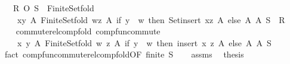 \begin{isabellebody}
\ \ \ {\isachardoublequoteopen}R\ O\ S\ {\isacharequal}{\kern0pt}\ Finite{\isacharunderscore}{\kern0pt}Set{\isachardot}{\kern0pt}fold\isanewline
\ \ \ \ {\isacharparenleft}{\kern0pt}{\isasymlambda}{\isacharparenleft}{\kern0pt}x{\isacharcomma}{\kern0pt}y{\isacharparenright}{\kern0pt}\ A{\isachardot}{\kern0pt}\ Finite{\isacharunderscore}{\kern0pt}Set{\isachardot}{\kern0pt}fold\ {\isacharparenleft}{\kern0pt}{\isasymlambda}{\isacharparenleft}{\kern0pt}w{\isacharcomma}{\kern0pt}z{\isacharparenright}{\kern0pt}\ A{\isacharprime}{\kern0pt}{\isachardot}{\kern0pt}\ if\ y\ {\isacharequal}{\kern0pt}\ w\ then\ Set{\isachardot}{\kern0pt}insert\ {\isacharparenleft}{\kern0pt}x{\isacharcomma}{\kern0pt}z{\isacharparenright}{\kern0pt}\ A{\isacharprime}{\kern0pt}\ else\ A{\isacharprime}{\kern0pt}{\isacharparenright}{\kern0pt}\ A\ S{\isacharparenright}{\kern0pt}\ {\isacharbraceleft}{\kern0pt}{\isacharbraceright}{\kern0pt}\ R{\isachardoublequoteclose}\isanewline
%
\isadelimproof
%
\endisadelimproof
%
\isatagproof
{}\isamarkupfalse%
\ {\isacharminus}{\kern0pt}\isanewline
\ \ \isamarkupfalse%
\ commute{\isacharunderscore}{\kern0pt}relcomp{\isacharunderscore}{\kern0pt}fold{\isacharcolon}{\kern0pt}\ comp{\isacharunderscore}{\kern0pt}fun{\isacharunderscore}{\kern0pt}commute\isanewline
\ \ \ \ {\isachardoublequoteopen}{\isacharparenleft}{\kern0pt}{\isasymlambda}{\isacharparenleft}{\kern0pt}x{\isacharcomma}{\kern0pt}\ y{\isacharparenright}{\kern0pt}\ A{\isachardot}{\kern0pt}\ Finite{\isacharunderscore}{\kern0pt}Set{\isachardot}{\kern0pt}fold\ {\isacharparenleft}{\kern0pt}{\isasymlambda}{\isacharparenleft}{\kern0pt}w{\isacharcomma}{\kern0pt}\ z{\isacharparenright}{\kern0pt}\ A{\isacharprime}{\kern0pt}{\isachardot}{\kern0pt}\ if\ y\ {\isacharequal}{\kern0pt}\ w\ then\ insert\ {\isacharparenleft}{\kern0pt}x{\isacharcomma}{\kern0pt}\ z{\isacharparenright}{\kern0pt}\ A{\isacharprime}{\kern0pt}\ else\ A{\isacharprime}{\kern0pt}{\isacharparenright}{\kern0pt}\ A\ S{\isacharparenright}{\kern0pt}{\isachardoublequoteclose}\isanewline
\ \ \ \ \isamarkupfalse%
\ {\isacharparenleft}{\kern0pt}fact\ comp{\isacharunderscore}{\kern0pt}fun{\isacharunderscore}{\kern0pt}commute{\isacharunderscore}{\kern0pt}relcomp{\isacharunderscore}{\kern0pt}fold{\isacharbrackleft}{\kern0pt}OF\ {\isacartoucheopen}finite\ S{\isacartoucheclose}{\isacharbrackright}{\kern0pt}{\isacharparenright}{\kern0pt}\isanewline
\ \ \isamarkupfalse%
\ assms\ \isamarkupfalse%
\ {\isacharquery}{\kern0pt}thesis\isanewline
\ \ \ \ \isamarkupfalse%

\end{isabellebody}

